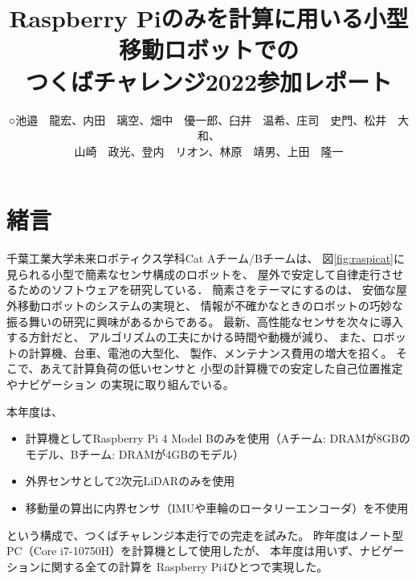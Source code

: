 \documentclass[twocolumn,9pt]{jsproceedings}
\title{Raspberry Piのみを計算に用いる小型移動ロボットでの\\つくばチャレンジ2022参加レポート}
\author{○池邉　龍宏\authorrefmark{1}、内田　璃空\authorrefmark{1}、畑中　優一郎\authorrefmark{1}、臼井　温希\authorrefmark{1}、庄司　史門\authorrefmark{1}、松井　大和\authorrefmark{1}、\\
山崎　政光\authorrefmark{1}、登内　リオン\authorrefmark{1}、林原　靖男\authorrefmark{1}、上田　隆一\authorrefmark{1}}
\affiliation{千葉工業大学 未来ロボティクス学科 Cat Aチーム/Bチーム}
\begin{document}
\maketitle



\section{緒言}

千葉工業大学未来ロボティクス学科Cat Aチーム/Bチームは、
図\ref{fig:raspicat}に見られる小型で簡素なセンサ構成のロボットを、
屋外で安定して自律走行させるためのソフトウェアを研究している．
簡素さをテーマにするのは、
安価な屋外移動ロボットのシステムの実現と、
情報が不確かなときのロボットの巧妙な振る舞いの研究に興味があるからである。
最新、高性能なセンサを次々に導入する方針だと、
アルゴリズムの工夫にかける時間や動機が減り、
また、ロボットの計算機、台車、電池の大型化、
製作、メンテナンス費用の増大を招く。
そこで、あえて計算負荷の低いセンサと
小型の計算機での安定した自己位置推定やナビゲーション
の実現に取り組んでいる。


本年度は、
\begin{itemize}
\item 計算機としてRaspberry Pi 4 Model Bのみを使用（Aチーム: DRAMが8GBのモデル、Bチーム: DRAMが4GBのモデル）
\item 外界センサとして2次元LiDARのみを使用
\item 移動量の算出に内界センサ（IMUや車輪のロータリーエンコーダ）を不使用
\end{itemize}
という構成で、つくばチャレンジ本走行での完走を試みた。
昨年度はノート型PC（Core i7-10750H）を計算機として使用したが、
本年度は用いず、ナビゲーションに関する全ての計算を
Raspberry Pi4ひとつで実現した。
\end{document}
